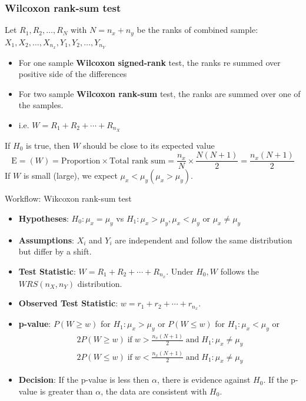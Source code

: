\documentclass[a4paper]{article}
\begin{document}
\subsubsection{Wilcoxon rank-sum test}
Let \( R_1,R_2,\dots,R_N \) with \( N = n_x + n_y \) be the ranks of combined sample: \( X_1,X_2,\dotsc,X_{n_x}, Y_1,Y_2,\dots,Y_{n_Y} \)
\begin{itemize}
	\item For one sample \textcolor{myred}{\textbf{Wilcoxon signed-rank}} test, the ranks re summed over positive side of the differences
	\item For two sample \textcolor{mygreen}{\textbf{Wilcoxon rank-sum}} test, the ranks are summed over one of the samples.
	\item i.e. \( W =R_1 + R_2 + \dotsb + R_{n_X} \) 
\end{itemize}
If \( H_0 \) is true, then \( W \) should be close to its expected value
\[
	\mathrm{\mathrm{E}}=(W) = \text{Proportion} \times \text{Total rank sum} = \frac{n_x}{N} \times \frac{N(N+1)}{2} = \frac{n_x (N+1)}{2}
\]
If \( W \) is small (large), we expect \( \mu_x < \mu_y (\mu_x > \mu_y) \).
\begin{redbox}{Workflow: Wikcoxon rank-sum test}
	\begin{itemize}
		\item \textbf{Hypotheses}: \( H_0: \mu_x = \mu_y \) vs \( H_1: \mu_x > \mu_y, \mu_x < \mu_y \) or \( \mu_x \neq \mu_y \)
		\item \textbf{Assumptions}: \( X_i \) and \( Y_i \) are independent and follow the same distribution but differ by a shift.
		\item \textbf{Test Statistic}: \( W = R_1 + R_2 + \dotsb + R_{n_x} \). Under \( H_0, W \) follows the \( WRS (n_X,n_Y) \) distribution.
		\item \textbf{Observed Test Statistic}: \( w = r_1 + r_2 + \dotsb + r_{n_x} \).
		\item \textbf{p-value}: \( P(W \geq w) \) for \( H_1: \mu_x > \mu_y \) or \( P(W \leq w) \) for \( H_1: \mu_x < \mu_y \) or
		\begin{gather*}
			2P(W \geq w) \;\text{if}\; w > \frac{n_x(N+1)}{2} \;\text{and}\; H_1: \mu_x \neq \mu_y\\
			2P(W \leq w) \;\text{if}\; w < \frac{n_x(N+1)}{2} \;\text{and}\; H_1: \mu_x \neq \mu_y
		\end{gather*}
		\item \textbf{Decision}: If the p-value is less then \( \alpha \), there is evidence against \( H_0 \). If the p-value is greater than \( \alpha \), the data are consistent with \( H_0 \).
	\end{itemize}
\end{redbox}
\end{document}
